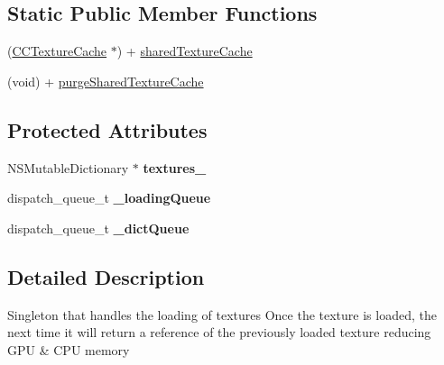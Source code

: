 \subsection*{Static Public Member Functions}
\begin{DoxyCompactItemize}
\item 
(\hyperlink{interface_c_c_texture_cache}{C\-C\-Texture\-Cache} $\ast$) + \hyperlink{interface_c_c_texture_cache_a165dc20d3e1be71265250c70f735fc40}{shared\-Texture\-Cache}
\item 
(void) + \hyperlink{interface_c_c_texture_cache_ac673f75cd5418bdcecf1fb8717a40345}{purge\-Shared\-Texture\-Cache}
\end{DoxyCompactItemize}
\subsection*{Protected Attributes}
\begin{DoxyCompactItemize}
\item 
\hypertarget{interface_c_c_texture_cache_a615df4e802382e18fdfb737a9f75b445}{N\-S\-Mutable\-Dictionary $\ast$ {\bfseries textures\-\_\-}}\label{interface_c_c_texture_cache_a615df4e802382e18fdfb737a9f75b445}

\item 
\hypertarget{interface_c_c_texture_cache_ab7cc623781bc53fd3f4b700ce42530aa}{dispatch\-\_\-queue\-\_\-t {\bfseries \-\_\-loading\-Queue}}\label{interface_c_c_texture_cache_ab7cc623781bc53fd3f4b700ce42530aa}

\item 
\hypertarget{interface_c_c_texture_cache_abdc4e30449fd0bac6a6d5b3757c954fc}{dispatch\-\_\-queue\-\_\-t {\bfseries \-\_\-dict\-Queue}}\label{interface_c_c_texture_cache_abdc4e30449fd0bac6a6d5b3757c954fc}

\end{DoxyCompactItemize}


\subsection{Detailed Description}
Singleton that handles the loading of textures Once the texture is loaded, the next time it will return a reference of the previously loaded texture reducing G\-P\-U \& C\-P\-U memory 

